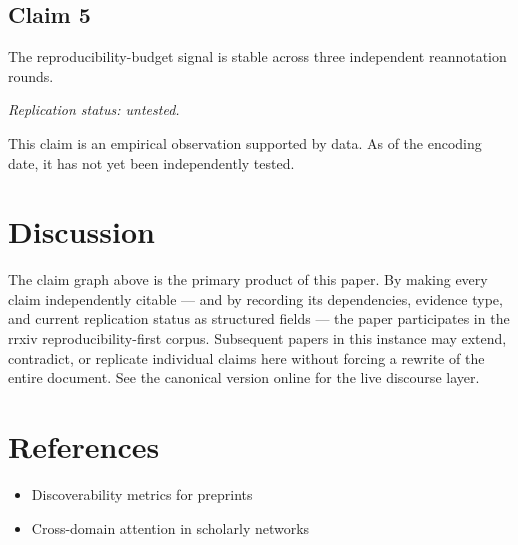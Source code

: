 \documentclass{rrxiv}
\begin{document}
\subsection*{Claim 5}
\begin{claim}[Claim 5]
\label{claim:c5}
The reproducibility-budget signal is stable across three independent reannotation rounds.

\emph{Replication status: untested.}
\end{claim}
This claim is an empirical observation supported by data. As of the encoding date, it has not yet been independently tested.

\section{Discussion}
The claim graph above is the primary product of this paper. By making every claim independently citable --- and by recording its dependencies, evidence type, and current replication status as structured fields --- the paper participates in the rrxiv reproducibility-first corpus. Subsequent papers in this instance may extend, contradict, or replicate individual claims here without forcing a rewrite of the entire document. See the canonical version online for the live discourse layer.

\section{References}
\begin{itemize}[leftmargin=*]
\item Discoverability metrics for preprints
\item Cross-domain attention in scholarly networks
\end{itemize}
\end{document}
